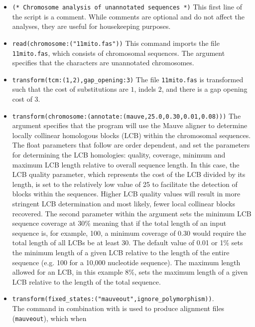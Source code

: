 \begin{itemize}
\item \texttt{(* Chromosome analysis of unannotated sequences *)} This first line of the script is a comment. While 
comments are optional and do not affect the analyses, they are useful for housekeeping purposes.
\item \texttt{read(chromosome:("11mito.fas"))} This command imports the file \texttt{11mito.fas}, which consists of 
chromosomal sequences. The argument  specifies that the characters are unannotated 
chromosomes.
\item \texttt{transform(tcm:(1,2),gap\_opening:3)} The file \texttt{11mito.fas} is transformed such that the cost of substitutions 
are $1$, indels $2$, and there is a gap opening cost of $3$.
\item \texttt{transform(chromosome:(annotate:(mauve,25.0,0.30,0.01,0.08)))} The argument  
specifies that the program will use the Mauve aligner \cite{darlingetal2004} to determine locally collinear 
homologous blocks (LCB) within the chromosomal sequences.  The float parameters that follow  
are order dependent, and set the parameters for determining the LCB homologies: quality, coverage, minimum and 
maximum LCB length relative to overall 
sequence length. In this case, the LCB quality parameter, which represents the cost of the LCB divided by its length, 
is set to the relatively low value of 25 to facilitate the detection of blocks within the sequences.  Higher LCB 
quality values will result in more stringent LCB determination and most likely, fewer local collinear blocks recovered.  The 
second parameter within the argument  sets the minimum LCB sequence coverage at 
30\% meaning that if the total length of an input sequence is, for example, 100, a minimum coverage of 0.30 would require 
the total length of all LCBs be at least 30. The default value of 0.01 or 1\% sets the minimum length of a given LCB 
relative to the length of the entire sequence (e.g. 100 for a 10,000 nucleotide sequence). The maximum length 
allowed for an LCB, in this example 8\%, sets the maximum length of a given LCB relative to the length of the total sequence.
\item \texttt{transform(fixed\_states:("mauveout",ignore\_polymorphism))}. \\ The  command 
in combination with  is used to produce alignment files (\texttt{mauveout}), which when  

\end{itemize}
